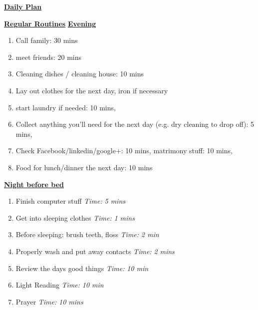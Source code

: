 \documentclass[serif,mathserif,final]{beamer}
\newcommand{\timeEst}[1]{\textit{Time:} \textit{#1}}
\begin{document}
\begin{frame}{}
\begin{columns}[t]
\begin{column}{0.27\linewidth}{\textbf{\underline{Daily Plan}}}
\begin{block} {\small \textbf{\underline{Regular Routines}} }
\underline{\textbf{Evening}}

\begin{enumerate}
\item \tiny Call family: 30 mins
\item \tiny meet friends: 20 mins
\item \tiny Cleaning dishes / cleaning house: 10 mins
\item \tiny Lay out clothes for the next day, iron if necessary
\item \tiny start laundry if needed: 10 mins,
\item \tiny Collect anything you’ll need for the next day (e.g. dry cleaning to drop off): 5 mins,
\item \tiny Check Facebook/linkedin/google+: 10 mins, matrimony stuff: 10 mins,
\item \tiny Food for lunch/dinner the next day: 10 mins
\end{enumerate}

\underline{\textbf{Night before bed}}
\begin{enumerate}
\item  \tiny Finish computer stuff \timeEst{5 mins}
\item  \tiny Get into sleeping clothes \timeEst{1 mins}
\item  \tiny Before sleeping: brush teeth, floss \timeEst{ 2 min}
\item  \tiny Properly wash and put away contacts \timeEst{ 2 mins}
\item  \tiny Review the days good things \timeEst{ 10 min}
\item  \tiny Light Reading \timeEst{ 10 min}
\item  \tiny Prayer \timeEst{10 mins}
\end{enumerate}

\end{block}

\end{column}%

\end{columns} 

\end{frame} 
\end{document}

